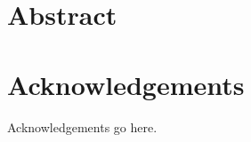 \documentclass[oneside, letterpaper, 12pt, oldfontcommands]{memoir}
\begin{document}
\frontmatter


\thetitlepage
\clearpage

\thecopyrightpage
\cleardoublepage

\setcounter{page}{1}

\section{Abstract}
\uwabstract
\cleardoublepage

\section{Acknowledgements}
Acknowledgements go here.
\clearpage

\tableofcontents* %
\clearpage
\listoffigures  %
\end{document}
